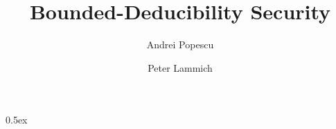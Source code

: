 \documentclass[11pt,a4paper]{article}
\begin{document}
\title{Bounded-Deducibility Security}
\author{Andrei Popescu \and Peter Lammich}
\date{}
\maketitle

\tableofcontents

\parindent 0pt\parskip 0.5ex




\end{document}
